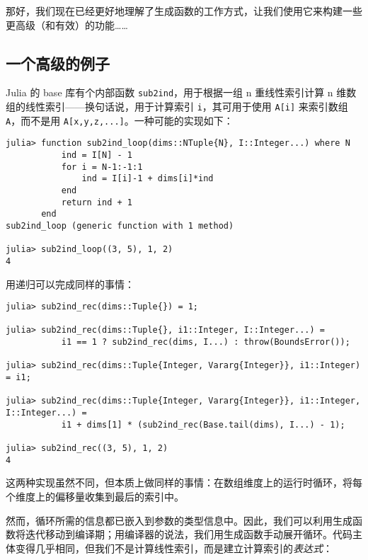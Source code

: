 那好，我们现在已经更好地理解了生成函数的工作方式，让我们使用它来构建一些更高级（和有效）的功能……



\hypertarget{13559476639927770222}{}


\subsection{一个高级的例子}



Julia 的 base 库有个内部函数 \texttt{sub2ind}，用于根据一组 n 重线性索引计算 n 维数组的线性索引——换句话说，用于计算索引 \texttt{i}，其可用于使用 \texttt{A[i]} 来索引数组 \texttt{A}，而不是用 \texttt{A[x,y,z,...]}。一种可能的实现如下：




\begin{verbatim}
julia> function sub2ind_loop(dims::NTuple{N}, I::Integer...) where N
           ind = I[N] - 1
           for i = N-1:-1:1
               ind = I[i]-1 + dims[i]*ind
           end
           return ind + 1
       end
sub2ind_loop (generic function with 1 method)

julia> sub2ind_loop((3, 5), 1, 2)
4
\end{verbatim}



用递归可以完成同样的事情：




\begin{verbatim}
julia> sub2ind_rec(dims::Tuple{}) = 1;

julia> sub2ind_rec(dims::Tuple{}, i1::Integer, I::Integer...) =
           i1 == 1 ? sub2ind_rec(dims, I...) : throw(BoundsError());

julia> sub2ind_rec(dims::Tuple{Integer, Vararg{Integer}}, i1::Integer) = i1;

julia> sub2ind_rec(dims::Tuple{Integer, Vararg{Integer}}, i1::Integer, I::Integer...) =
           i1 + dims[1] * (sub2ind_rec(Base.tail(dims), I...) - 1);

julia> sub2ind_rec((3, 5), 1, 2)
4
\end{verbatim}



这两种实现虽然不同，但本质上做同样的事情：在数组维度上的运行时循环，将每个维度上的偏移量收集到最后的索引中。



然而，循环所需的信息都已嵌入到参数的类型信息中。因此，我们可以利用生成函数将迭代移动到编译期；用编译器的说法，我们用生成函数手动展开循环。代码主体变得几乎相同，但我们不是计算线性索引，而是建立计算索引的\emph{表达式}：




